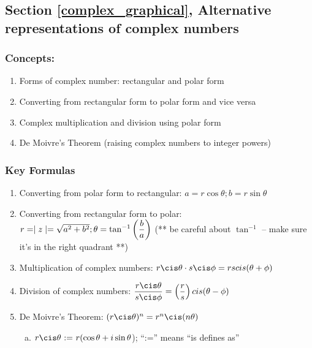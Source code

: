 \subsection*{Section \ref{complex_graphical}, Alternative representations of complex numbers}
\subsubsection*{Concepts:}
\begin{enumerate}
\item 
Forms of complex number: rectangular and polar form
\item
Converting from rectangular form to polar form and vice versa
\item
Complex multiplication and division using polar form
\item
De Moivre's Theorem (raising complex numbers to integer powers)
\end{enumerate}

\subsubsection*{Key Formulas}
\begin{enumerate}
\item 
Converting from polar form to rectangular: $a = r\cos\theta; b = r\sin\theta$
\item 
Converting from rectangular form to polar: $r = \mid z \mid = \sqrt{a^{2}+b^{2}}; \\\theta = \tan^{-1}\left(\dfrac{b}{a}\right)$ (** be careful about $\tan^{-1}$ -- make sure it's in the right quadrant **)    
\item 
Multiplication of complex numbers: $r \cis \theta \cdot s \cis \phi = rscis(\theta + \phi)$ 
\item 
Division of complex numbers: $\dfrac{r \cis \theta}{s \cis \phi} = \left(\dfrac{r}{s}\right)cis(\theta - \phi)$
\item 
De Moivre's Theorem: $(r \cis \theta)^{n} = r^{n}\cis(n \theta)$

\begin{enumerate}[(a)]
\item
$r \cis \theta \text{ := } r(\cos\theta +  i\sin\theta$); ``:='' means ``is defines as''
\end{enumerate}
\end{enumerate}

